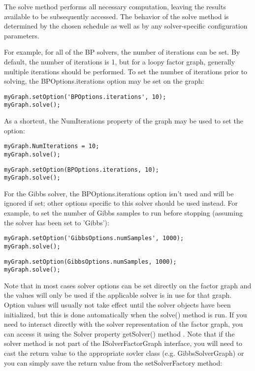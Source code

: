 The solve method performs all necessary computation, leaving the results available to be subsequently accessed.  The behavior of the solve method is determined by the chosen schedule as well as by any solver-specific configuration parameters.

For example, for all of the BP solvers, the number of iterations can be set.  By default, the number of iterations is 1, but for a loopy factor graph, generally multiple iterations should be performed.  To set the number of iterations prior to solving, the BPOptions.iterations option may be set on the graph:

\ifmatlab

\begin{lstlisting}
myGraph.setOption('BPOptions.iterations', 10);
myGraph.solve();
\end{lstlisting}

As a shortcut, the NumIterations property of the graph may be used to set the option:

\begin{lstlisting}
myGraph.NumIterations = 10;
myGraph.solve();
\end{lstlisting}

\fi

\ifjava

\begin{lstlisting}
myGraph.setOption(BPOptions.iterations, 10);
myGraph.solve();
\end{lstlisting}


\fi

For the Gibbs solver, the BPOptions.iterations option isn't used and will be ignored if set; other options specific to this solver should be used instead.  For example, to set the number of Gibbs samples to run before stopping (assuming the solver has been set to 'Gibbs'):

\ifmatlab
\begin{lstlisting}
myGraph.setOption('GibbsOptions.numSamples', 1000);
myGraph.solve();
\end{lstlisting}
\fi

\ifjava
\begin{lstlisting}
myGraph.setOption(GibbsOptions.numSamples, 1000);
myGraph.solve();
\end{lstlisting}
\fi

Note that in most cases solver options can be set directly on the factor graph and the values will only be used if the applicable solver is in use for that graph. Option values will usually not take effect until the solver objects have been initialized, but this is done automatically when the solve() method is run. If you need to interact directly with the solver representation of the factor graph, you can access it using
the \ifmatlab Solver property \fi \ifjava getSolver() method \fi. \ifjava  Note that if the solver method is not part of the ISolverFactorGraph interface, you will need to cast the return value to the appropriate sovler class (e.g. GibbsSolverGraph) or you can simply save the return value from the setSolverFactory method:

